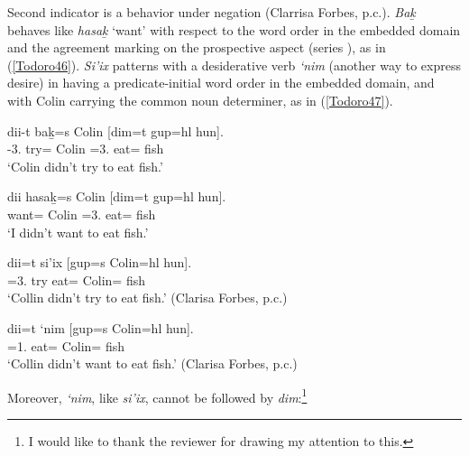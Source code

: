 \documentclass[output=paper]{langscibook}
\begin{document}
Second indicator is a behavior  under negation (Clarrisa Forbes, p.c.). \emph{Bak̲}  behaves  like \emph{hasak̲} ‘want’ with respect to the word order in the embedded domain and the agreement marking on the prospective aspect (series ), as in (\ref{Todoro46}). \emph{Si’ix} patterns with a desiderative verb \emph{‘nim} (another way to express desire) in having  a predicate-initial word order in the embedded domain, and with Colin carrying the common noun determiner, as in (\ref{Todoro47}). 

\begin{exe}
\ex \label{Todoro46}
\begin{xlist}

\ex \label{Todoro46a}
 {dii-t} 	   {bak̲=}s	{Colin}	[{dim=t}	        {gup=hl} 	{hun}]. \\
    	-3.{\seriesI}  try={\pn} 	Colin 	 =3.{\seriesI}   eat=	 fish\\
\glt `Colin didn’t try to eat fish.' 

\ex \label{Todoro46b}
 	{dii} 	   {hasak̲=s} 	{Colin}	[{dim=t}	        {gup=hl} 	{hun}]. \\
    	 	   want={\pn}	Colin 	 =3.{\seriesI}   eat=	 fish\\
\glt ‘I didn’t want to eat fish.' 

\end{xlist}
\end{exe}

\begin{exe}
\ex \label{Todoro47}
\begin{xlist}

\ex \label{Todoro47a}
 	{dii=t} 		{si’ix} 	[{gup=s} 	{Colin=hl}	{hun}]. \\
     	=3.{\seriesI} 	try 	eat={\pn} 	Colin= 	fish\\
\glt ‘Collin didn’t try to eat fish.’ (Clarisa Forbes, p.c.) 

\ex \label{Todoro47b}
 	{dii=t} 	   {‘nim} 	[{gup=s} 	{Colin=hl}	{hun}].\\
     	=1.{\seriesI}  	eat={\pn}	Colin= 	fish\\
\glt `Collin didn’t want to eat fish.’               (Clarisa Forbes, p.c.) 

\end{xlist}
\end{exe}

Moreover, \emph{‘nim}, like \emph{si’ix}, cannot be followed by \emph{dim}:\footnote{I would like to thank the reviewer for drawing my attention to this.}  
\end{document}
